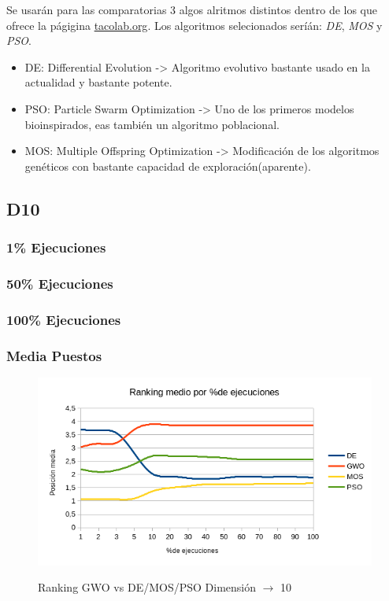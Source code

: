 \documentclass[a4paper, 12.5pt]{report}
\begin{document}
Se usarán para las comparatorias 3 algos alritmos distintos dentro de los que ofrece la págigina \url{tacolab.org}. Los algoritmos selecionados seríán: \textit{DE}, \textit{MOS} y \textit{PSO}.
\begin{itemize}
    \item DE: Differential Evolution -> Algoritmo evolutivo bastante usado en la actualidad y bastante potente.
    \item PSO: Particle Swarm Optimization -> Uno de los primeros modelos bioinspirados, eas también un algoritmo poblacional.
    \item MOS: Multiple Offspring Optimization -> Modificación de los algoritmos genéticos con bastante capacidad de exploración(aparente).
\end{itemize}



\subsection{D10}

\subsubsection*{1\% Ejecuciones}

\subsubsection*{50\% Ejecuciones}


\subsubsection*{100\% Ejecuciones}




\subsubsection*{Media Puestos}



\begin{figure}[H]

    \caption{Ranking GWO vs DE/MOS/PSO Dimensión $\rightarrow$ 10}

    \includegraphics[width=1\textwidth]{Resultados/basico/d10/Grafico_puestos.png} \label{img:ranking-D10}
\end{figure}
\end{document}
